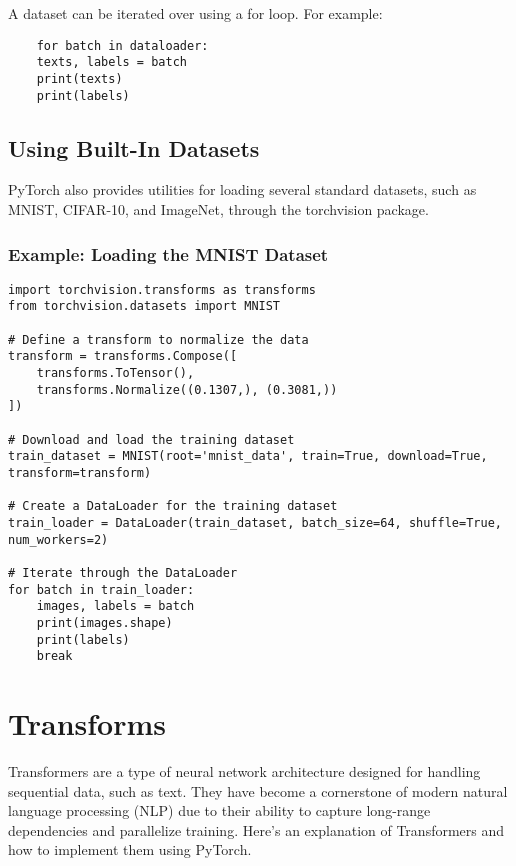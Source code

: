 \documentclass{article}
\begin{document}
A dataset can be iterated over using a for loop. For example:

\begin{lstlisting}
    for batch in dataloader:
    texts, labels = batch
    print(texts)
    print(labels)
\end{lstlisting}

\subsection{Using Built-In Datasets}

PyTorch also provides utilities for loading several standard datasets, such as MNIST, CIFAR-10, and ImageNet, through the torchvision package.

\subsubsection{Example: Loading the MNIST Dataset}

\begin{lstlisting}
import torchvision.transforms as transforms
from torchvision.datasets import MNIST

# Define a transform to normalize the data
transform = transforms.Compose([
    transforms.ToTensor(),
    transforms.Normalize((0.1307,), (0.3081,))
])

# Download and load the training dataset
train_dataset = MNIST(root='mnist_data', train=True, download=True, transform=transform)

# Create a DataLoader for the training dataset
train_loader = DataLoader(train_dataset, batch_size=64, shuffle=True, num_workers=2)

# Iterate through the DataLoader
for batch in train_loader:
    images, labels = batch
    print(images.shape)
    print(labels)
    break

\end{lstlisting}

\section{Transforms}

Transformers are a type of neural network architecture designed for 
handling sequential data, such as text. They have become a cornerstone of 
modern natural language processing (NLP) due to their ability to capture 
long-range dependencies and parallelize training. Here’s an explanation of 
Transformers and how to implement them using PyTorch.\\
\end{document}

